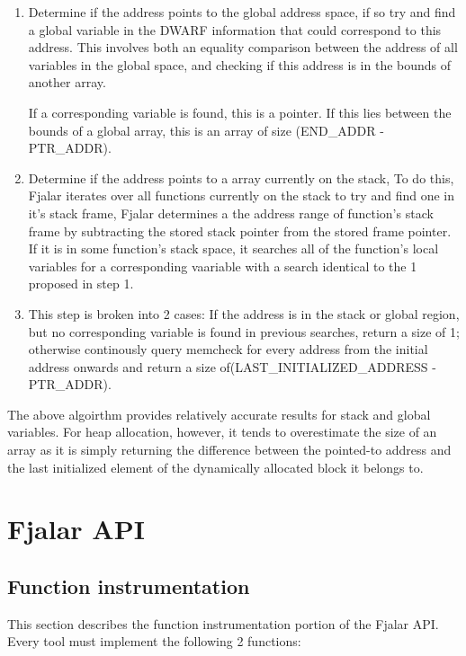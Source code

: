 \documentclass{article}
\begin{document}
\begin{enumerate}

\item Determine if the address points to the global address space, if so
   try and find a global variable in the DWARF information that could
   correspond to this address. This involves both an equality comparison
   between the address of all variables in the global space, and checking
   if this address is in the bounds of another array.
   
   If a corresponding variable is found, this is a pointer. If this lies
   between the bounds of a global array, this is an array of size
   (END\_ADDR - PTR\_ADDR). 

\item Determine if the address points to a array currently on the stack,
   To do this, Fjalar iterates over all functions currently on the
   stack to try and find one in it's stack frame, Fjalar determines a
   the address range of function's stack frame by subtracting the
   stored stack pointer from the stored frame pointer. If it is in
   some function's stack space, it searches all of the function's
   local variables for a corresponding vaariable with a search
   identical to the 1 proposed in step 1.

\item This step is broken into 2 cases: If the address is in the stack or
  global region, but no corresponding variable is found in previous
  searches, return a size of 1; otherwise continously query memcheck
  for every address from the initial address onwards and return a size
  of(LAST\_INITIALIZED\_ADDRESS - PTR\_ADDR).

\end{enumerate} 
The above algoirthm provides relatively accurate results for stack and
global variables. For heap allocation, however, it tends to
overestimate the size of an array as it is simply returning the
difference between the pointed-to address and the last initialized
element of the dynamically allocated block it belongs to.

\section{Fjalar API}

\subsection{Function instrumentation}
This section describes the function instrumentation portion of the
Fjalar API. Every tool must implement the following 2 functions:
\end{document}
